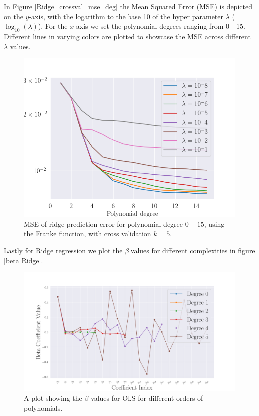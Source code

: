 \noindent In Figure \eqref{Ridge_crossval_mse_deg} the Mean Squared Error (MSE) is depicted on the $y$-axis, with the logarithm to the base 10 of the hyper parameter $\lambda$ ($\log_{10}(\lambda)$). For the $x$-axis we set the polynomial degrees ranging from 0 - 15. Different lines in varying colors are plotted to showcase the MSE across different $\lambda$ values.
%
\begin{figure}[H]
	\centering
	\includegraphics[width=\linewidth]{images/cv_ridge.png}
	\caption{MSE of ridge prediction error for polynomial degree $0-15$, using the Franke function, with cross validation $k=5$.}
 \label{Ridge_crossval_mse_deg}
\end{figure}
%
\noindent Lastly for Ridge regression we plot the $\beta$ values for different complexities in figure \eqref{beta Ridge}. 
\begin{figure}[H]
	\centering
	\includegraphics[width=\linewidth]{images/Figure_34.png}
	\caption{A plot showing the $\beta$ values for OLS for different orders of polynomials.}
	\label{beta Ridge}
\end{figure}

